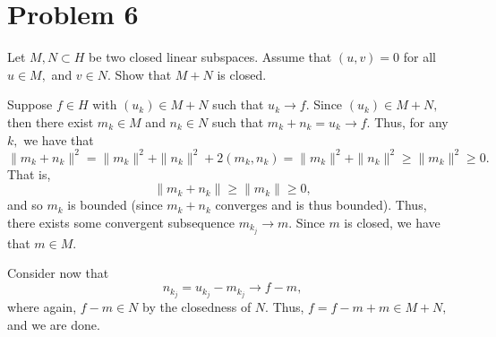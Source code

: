 \documentclass[11pt]{article}
\begin{document}
\section*{Problem 6}
\begin{problem}
    Let $M, N \subset H$ be two closed linear subspaces. Assume that $(u,v) = 0$ for all $u \in M,$ and $v\in N.$ Show that $M+ N$ is closed.
\end{problem}
\begin{solution}
    Suppose $f\in H$ with $(u_k)\in M + N$ such that $u_k \to f.$ Since $(u_k)\in M+ N,$ then there exist $m_k \in M$ and $n_k \in N$ such that $m_k + n_k  = u_k \to f.$ 
    Thus, for any $k,$ we have that 
    \[\|m_k + n_k\|^2 = \|m_k\|^2 + \|n_k\|^2 + 2(m_k,n_k) = \|m_k\|^2 + \|n_k\|^2\geq \|m_k\|^2 \geq 0.\] That is, 
    \[\|m_k + n_k\| \geq \|m_k\|\geq 0,\] and so $m_k$ is bounded (since $m_k + n_k$ converges and is thus bounded). Thus, there exists some convergent subsequence $m_{k_j} \to m.$ Since $m$ is closed, we have that $m \in M.$ 
    
    Consider now that 
    \[n_{k_j} = u_{k_j} - m_{k_j} \to f - m,\] where again, $f-m \in N$ by the closedness of $N.$ Thus, $f = f-m + m \in M+ N,$ and we are done.
\end{solution}

\newpage
\end{document}
